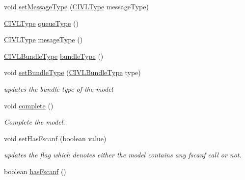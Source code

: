 \begin{DoxyCompactItemize}
\item 
void \hyperlink{interfaceedu_1_1udel_1_1cis_1_1vsl_1_1civl_1_1model_1_1IF_1_1Model_a5b61d7ba447af908ec5d2988c7b98e93}{set\+Message\+Type} (\hyperlink{interfaceedu_1_1udel_1_1cis_1_1vsl_1_1civl_1_1model_1_1IF_1_1type_1_1CIVLType}{C\+I\+V\+L\+Type} message\+Type)
\item 
\hyperlink{interfaceedu_1_1udel_1_1cis_1_1vsl_1_1civl_1_1model_1_1IF_1_1type_1_1CIVLType}{C\+I\+V\+L\+Type} \hyperlink{interfaceedu_1_1udel_1_1cis_1_1vsl_1_1civl_1_1model_1_1IF_1_1Model_a8f766883a174af7c62d0a426e0e729fd}{queue\+Type} ()
\item 
\hyperlink{interfaceedu_1_1udel_1_1cis_1_1vsl_1_1civl_1_1model_1_1IF_1_1type_1_1CIVLType}{C\+I\+V\+L\+Type} \hyperlink{interfaceedu_1_1udel_1_1cis_1_1vsl_1_1civl_1_1model_1_1IF_1_1Model_a711a00c94fcef424139780db2c10db75}{mesage\+Type} ()
\item 
\hyperlink{interfaceedu_1_1udel_1_1cis_1_1vsl_1_1civl_1_1model_1_1IF_1_1type_1_1CIVLBundleType}{C\+I\+V\+L\+Bundle\+Type} \hyperlink{interfaceedu_1_1udel_1_1cis_1_1vsl_1_1civl_1_1model_1_1IF_1_1Model_ad0dab44b2245b8999204364b95df4638}{bundle\+Type} ()
\item 
void \hyperlink{interfaceedu_1_1udel_1_1cis_1_1vsl_1_1civl_1_1model_1_1IF_1_1Model_aff81baacda461e6e7a3de6f9d88ed6b4}{set\+Bundle\+Type} (\hyperlink{interfaceedu_1_1udel_1_1cis_1_1vsl_1_1civl_1_1model_1_1IF_1_1type_1_1CIVLBundleType}{C\+I\+V\+L\+Bundle\+Type} type)
\begin{DoxyCompactList}\small\item\em updates the bundle type of the model \end{DoxyCompactList}\item 
void \hyperlink{interfaceedu_1_1udel_1_1cis_1_1vsl_1_1civl_1_1model_1_1IF_1_1Model_a15ac0403504ff077e5483591eb8f3ca9}{complete} ()
\begin{DoxyCompactList}\small\item\em Complete the model. \end{DoxyCompactList}\item 
void \hyperlink{interfaceedu_1_1udel_1_1cis_1_1vsl_1_1civl_1_1model_1_1IF_1_1Model_af441b2e458956de0fa5b31d21055fdfc}{set\+Has\+Fscanf} (boolean value)
\begin{DoxyCompactList}\small\item\em updates the flag which denotes either the model contains any fscanf call or not. \end{DoxyCompactList}\item 
boolean \hyperlink{interfaceedu_1_1udel_1_1cis_1_1vsl_1_1civl_1_1model_1_1IF_1_1Model_af94f0c7276d029a63e9cf1ee518533c8}{has\+Fscanf} ()

\end{DoxyCompactItemize}
